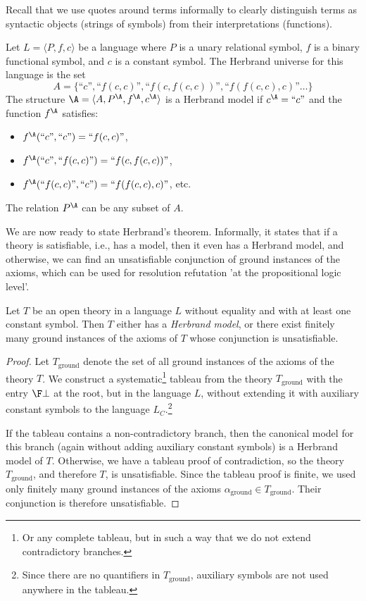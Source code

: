 Recall that we use quotes around terms informally to clearly distinguish terms as syntactic objects (strings of symbols) from their interpretations (functions).

\begin{example}
Let $L=\langle P,f,c\rangle$ be a language where $P$ is a unary relational symbol, $f$ is a binary functional symbol, and $c$ is a constant symbol. The Herbrand universe for this language is the set
$$
A=\{\text{``$c$''},\text{``$f(c,c)$''},\text{``$f(c,f(c,c))$''},\text{``$f(f(c,c),c)$''}\dots\}
$$
The structure $\A=\langle A,P^\A,f^\A,c^\A\rangle$ is a Herbrand model if $c^\A=\text{``$c$''}$ and the function $f^\A$ satisfies:
\begin{itemize}
    \item $f^\A(\text{``$c$''},\text{``$c$''})=\text{``$f(c,c)$''}$,
    \item $f^\A(\text{``$c$''},\text{``$f(c,c)$''})=\text{``$f(c,f(c,c))$''}$,
    \item $f^\A(\text{``$f(c,c)$''},\text{``$c$''})=\text{``$f(f(c,c),c)$''}$, etc.
\end{itemize}
The relation $P^\A$ can be any subset of $A$.
\end{example}

We are now ready to state Herbrand's theorem. Informally, it states that if a theory is satisfiable, i.e., has a model, then it even has a Herbrand model, and otherwise, we can find an unsatisfiable conjunction of ground instances of the axioms, which can be used for resolution refutation 'at the propositional logic level'.

\begin{theorem}
Let $T$ be an open theory in a language $L$ without equality and with at least one constant symbol. Then $T$ either has a \emph{Herbrand model}, or there exist finitely many ground instances of the axioms of $T$ whose conjunction is unsatisfiable.
\end{theorem}
\begin{proof}
Let $T_\text{ground}$ denote the set of all ground instances of the axioms of the theory $T$. We construct a systematic\footnote{Or any complete tableau, but in such a way that we do not extend contradictory branches.} tableau from the theory $T_\text{ground}$ with the entry $\F\bot$ at the root, but in the language $L$, without extending it with auxiliary constant symbols to the language $L_C$.\footnote{Since there are no quantifiers in $T_\text{ground}$, auxiliary symbols are not used anywhere in the tableau.}

If the tableau contains a non-contradictory branch, then the canonical model for this branch (again without adding auxiliary constant symbols) is a Herbrand model of $T$. Otherwise, we have a tableau proof of contradiction, so the theory $T_\text{ground}$, and therefore $T$, is unsatisfiable. Since the tableau proof is finite, we used only finitely many ground instances of the axioms $\alpha_\text{ground}\in T_\text{ground}$. Their conjunction is therefore unsatisfiable.
\end{proof}

